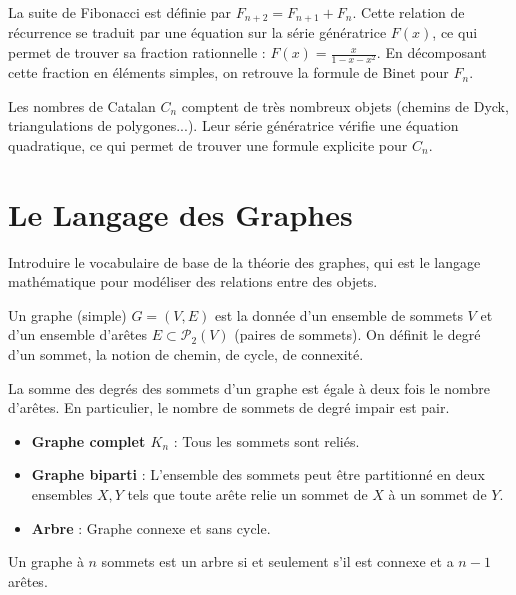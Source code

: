 \begin{example}
    La suite de Fibonacci est définie par $F_{n+2} = F_{n+1} + F_n$. Cette relation de récurrence se traduit par une équation sur la série génératrice $F(x)$, ce qui permet de trouver sa fraction rationnelle : $F(x) = \frac{x}{1-x-x^2}$. En décomposant cette fraction en éléments simples, on retrouve la formule de Binet pour $F_n$.
\end{example}

\begin{example}
    Les nombres de Catalan $C_n$ comptent de très nombreux objets (chemins de Dyck, triangulations de polygones...). Leur série génératrice vérifie une équation quadratique, ce qui permet de trouver une formule explicite pour $C_n$.
\end{example}

\section{Le Langage des Graphes}

\begin{objectif}
    Introduire le vocabulaire de base de la théorie des graphes, qui est le langage mathématique pour modéliser des relations entre des objets.
\end{objectif}

\begin{definition}[Graphe]
    Un graphe (simple) $G=(V,E)$ est la donnée d'un ensemble de sommets $V$ et d'un ensemble d'arêtes $E \subset \mathcal{P}_2(V)$ (paires de sommets).
    On définit le degré d'un sommet, la notion de chemin, de cycle, de connexité.
\end{definition}

\begin{proposition}
    La somme des degrés des sommets d'un graphe est égale à deux fois le nombre d'arêtes. En particulier, le nombre de sommets de degré impair est pair.
\end{proposition}

\begin{definition}
    \begin{itemize}
        \item \textbf{Graphe complet $K_n$} : Tous les sommets sont reliés.
        \item \textbf{Graphe biparti} : L'ensemble des sommets peut être partitionné en deux ensembles $X,Y$ tels que toute arête relie un sommet de $X$ à un sommet de $Y$.
        \item \textbf{Arbre} : Graphe connexe et sans cycle.
    \end{itemize}
\end{definition}
\begin{theorem}
    Un graphe à $n$ sommets est un arbre si et seulement s'il est connexe et a $n-1$ arêtes.
\end{theorem}

